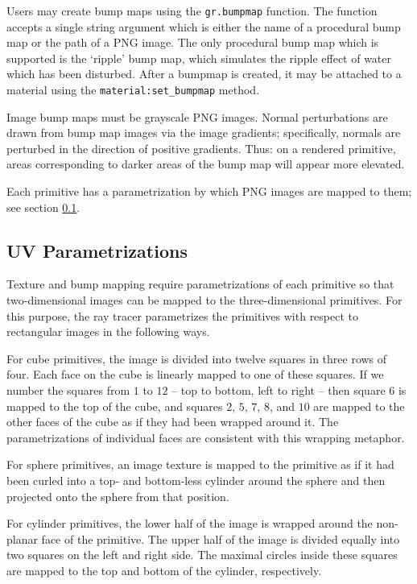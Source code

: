 \documentclass{article}
\begin{document}
Users may create bump maps using the {\tt gr.bumpmap} function. The function accepts
a single string argument which is either the name of a procedural bump map or the
path of a PNG image. The only procedural bump map which is supported is the
`ripple' bump map, which simulates the ripple effect of water which has been
disturbed. After a bumpmap is created, it may be attached to a material using
the {\tt material:set\_bumpmap} method.

Image bump maps must be grayscale PNG images. Normal perturbations are drawn
from bump map images via the image gradients; specifically, normals are
perturbed in the direction of positive gradients. Thus: on a rendered primitive,
areas corresponding to darker areas of the bump map will appear more elevated.

Each primitive has a parametrization by which PNG images are mapped to them; see
section \ref{uv_parametrizations}.

\subsection{UV Parametrizations}
\label{uv_parametrizations}

Texture and bump mapping require parametrizations of each primitive so that
two-dimensional images can be mapped to the three-dimensional primitives. For
this purpose, the ray tracer parametrizes the primitives with respect to
rectangular images in the following ways.

For cube primitives, the image is divided into twelve squares in three rows of
four. Each face on the cube is linearly mapped to one of these squares. If we
number the squares from $1$ to $12$ -- top to bottom, left to right -- then
square $6$ is mapped to the top of the cube, and squares $2$, $5$, $7$, $8$, and
$10$ are mapped to the other faces of the cube as if they had been wrapped
around it. The parametrizations of individual faces are consistent with this
wrapping metaphor.

For sphere primitives, an image texture is mapped to the primitive as if it
had been curled into a top- and bottom-less cylinder around the sphere and then
projected onto the sphere from that position.

For cylinder primitives, the lower half of the image is wrapped around the
non-planar face of the primitive. The upper half of the image is divided equally
into two squares on the left and right side. The maximal circles inside these
squares are mapped to the top and bottom of the cylinder, respectively.
\end{document}
